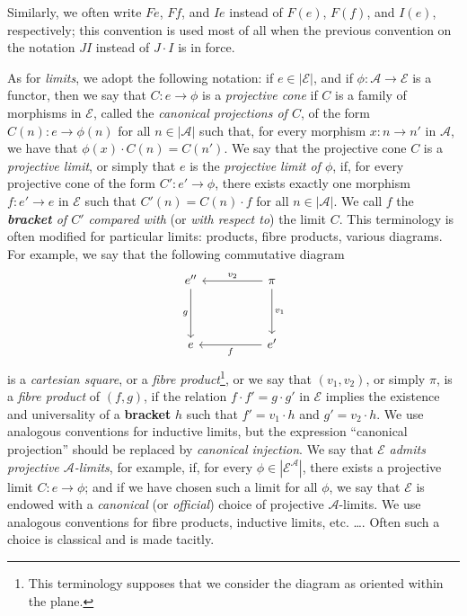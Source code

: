 \documentclass{article}
\newcommand{\oldpage}[1]{\marginpar{\footnotesize$\Big\vert$ \textit{p.~#1}}}
\newcommand{\unsure}[1]{{\color{purple}\textbf{#1}}}
\newcommand{\cat}[1]{\mathcal{#1}}
\newcommand{\set}[1]{|#1|}
\begin{document}
Similarly, we often write $Fe$, $Ff$, and $Ie$ instead of $F(e)$, $F(f)$, and $I(e)$, respectively; this convention is used most of all when the previous convention on the notation $JI$ instead of $J\cdot I$ is in force.

As for \emph{limits}, we adopt the following notation: if $e\in\set{\cat{E}}$, and if $\phi\colon \cat{A}\to\cat{E}$ is a functor, then we say that $C\colon e\to\phi$ is a \emph{projective cone} if $C$ is a family of morphisms in $\cat{E}$, called the \emph{canonical projections of $C$}, of the form $C(n)\colon e\to\phi(n)$ for all $n\in\set{\cat{A}}$ such that, for every morphism $x\colon n\to n'$ in $\cat{A}$, we have that $\phi(x)\cdot C(n)=C(n')$.
We say that the projective cone $C$ is a \emph{projective limit}, or simply that $e$ is the \emph{projective limit of $\phi$}, if, for every projective cone of the form $C'\colon e'\to\phi$, there exists exactly one morphism $f\colon e'\to e$ in $\cat{E}$ such that $C'(n)=C(n)\cdot f$ for all $n\in\set{\cat{A}}$.
We call $f$ the \emph{\unsure{bracket} of $C'$ compared with} (or \emph{with respect to}) the limit $C$.
This terminology is often modified for particular limits: products, fibre products, various diagrams.
For example, we say that the following commutative diagram
\oldpage{222}
\[
  \begin{tikzcd}[sep=huge]
    e'' \ar[d,swap,"g"]
  & \pi \ar[l,swap,"v_2"] \ar[d,"v_1"]
  \\e
  & e' \ar[l,"f"]
  \end{tikzcd}
\]
is a \emph{cartesian square}, or a \emph{fibre product}\footnote{This terminology supposes that we consider the diagram as oriented within the plane.}, or we say that $(v_1,v_2)$, or simply $\pi$, is a \emph{fibre product} of $(f,g)$, if the relation $f\cdot f'=g\cdot g'$ in $\cat{E}$ implies the existence and universality of a \unsure{bracket} $h$ such that $f'=v_1\cdot h$ and $g'=v_2\cdot h$.
We use analogous conventions for inductive limits, but the expression ``canonical projection''  should be replaced by \emph{canonical injection}.
We say that $\cat{E}$ \emph{admits projective $\cat{A}$-limits}, for example, if, for every $\phi\in\set{\cat{E}^\cat{A}}$, there exists a projective limit $C\colon e\to\phi$;
and if we have chosen such a limit for all $\phi$, we say that $\cat{E}$ is endowed with a \emph{canonical} (or \emph{official}) choice of projective $\cat{A}$-limits.
We use analogous conventions for fibre products, inductive limits, etc. \ldots.
Often such a choice is classical and is made tacitly.
\end{document}
